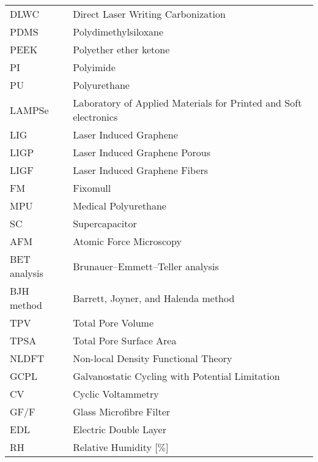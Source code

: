 
\begin{table}[H]
  
    
    \label{tab:abbrev}
\medskip 


\begin{tabular}{l l} 
DLWC & Direct Laser Writing Carbonization\\[15px]
PDMS &  Polydimethylsiloxane\\[15px]
PEEK & Polyether ether ketone\\[15px]
PI & Polyimide\\[15px]
PU & Polyurethane \\[15px]
LAMPSe & Laboratory of Applied Materials for Printed and Soft electronics\\[15px]
LIG & Laser Induced Graphene\\[15px]
LIGP & Laser Induced Graphene Porous \\[15px]
LIGF & Laser Induced Graphene Fibers \\[15px]
FM & Fixomull \\[15px]
MPU & Medical Polyurethane \\[15px]
SC & Supercapacitor \\[15px]
AFM & Atomic Force Microscopy\\[15px]
BET analysis & Brunauer–Emmett–Teller analysis \\[15px]
BJH method & Barrett, Joyner, and Halenda method  \\[15px]
TPV & Total Pore Volume\\[15px]
TPSA & Total Pore Surface Area\\[15px]
NLDFT & Non-local Density Functional Theory\\[15px]
GCPL & Galvanostatic Cycling with Potential Limitation\\[15px]
CV & Cyclic Voltammetry\\[15px]
GF/F & Glass Microfibre Filter\\[15px]
EDL & Electric Double Layer  \\[15px]
RH & Relative Humidity [$\%$]\\[15px]



\end{tabular}
\end{table}